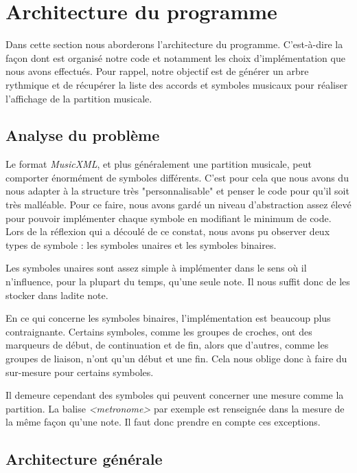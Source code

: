 \section{Architecture du programme}

\par
Dans cette section nous aborderons l'architecture du programme. C'est-à-dire la façon dont est organisé notre code et notamment les choix d’implémentation que nous avons effectués. Pour rappel, notre objectif est de générer un arbre rythmique et de récupérer la liste des accords et symboles musicaux pour réaliser l'affichage de la partition musicale.

\subsection{Analyse du problème}

\par
Le format \emph{MusicXML}, et plus généralement une partition musicale, peut comporter énormément de symboles différents. C'est pour cela que nous avons du nous adapter à la structure très "personnalisable" et penser le code pour qu'il soit très malléable. Pour ce faire, nous avons gardé un niveau d'abstraction assez élevé pour pouvoir implémenter chaque symbole en modifiant le minimum de code. Lors de la réflexion qui a découlé de ce constat, nous avons pu observer deux types de symbole : les symboles unaires et les symboles binaires.
\par
Les symboles unaires sont assez simple à implémenter dans le sens où il n'influence, pour la plupart du temps, qu'une seule note. Il nous suffit donc de les stocker dans ladite note.
\par
En ce qui concerne les symboles binaires, l'implémentation est beaucoup plus contraignante. Certains symboles, comme les groupes de croches, ont des marqueurs de début, de continuation et de fin, alors que d'autres, comme les groupes de liaison, n'ont qu'un début et une fin. Cela nous oblige donc à faire du sur-mesure pour certains symboles.
\par
Il demeure cependant des symboles qui peuvent concerner une mesure comme la partition. La balise \emph{<metronome>} par exemple est renseignée dans la mesure de la même façon qu'une note. Il faut donc prendre en compte ces exceptions.


\subsection{Architecture générale}

